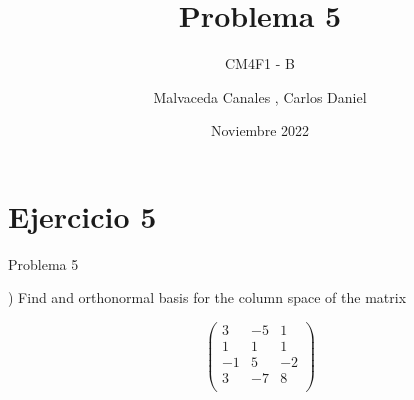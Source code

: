 \documentclass[11pt]{beamer}
\title{Problema 5}
\subtitle{CM4F1 - B}
\author{Malvaceda Canales , Carlos Daniel}
\institute{UNI}
\date{Noviembre 2022}
\begin{document}
\begin{frame}
  \titlepage
\end{frame}


\section{Ejercicio 5}

\begin{frame}{Problema 5}

) Find and orthonormal basis for the column space of the matrix 

\begin{equation*}
   \begin{pmatrix}
        3 & -5 & 1\\
        1 & 1 & 1 \\ 
        -1 & 5 & -2 \\
        3 & -7 & 8 \\
    \end{pmatrix} 
\end{equation*}

\end{frame}
\end{document}
